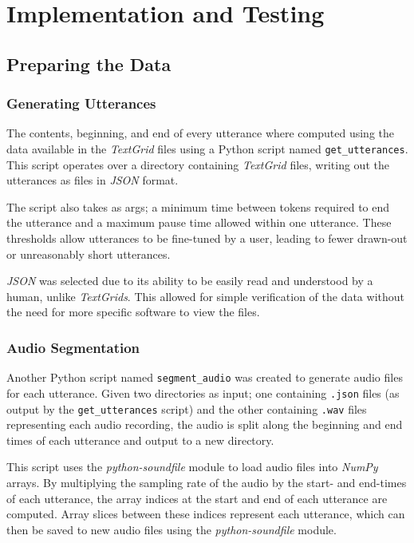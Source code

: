 \chapter{Implementation and Testing}\label{ch:implementation-and-testing}

\section{Preparing the Data}

\subsection{Generating Utterances}

The contents, beginning, and end of every utterance where computed using the data available in the \emph{TextGrid} files using a Python script named \texttt{get\_utterances}.
This script operates over a directory containing \emph{TextGrid} files, writing out the utterances as files in \emph{JSON} format.

The script also takes as args; a minimum time between tokens required to end the utterance and a maximum pause time allowed within one utterance.
These thresholds allow utterances to be fine-tuned by a user, leading to fewer drawn-out or unreasonably short utterances.

\emph{JSON} was selected due to its ability to be easily read and understood by a human, unlike \emph{TextGrids}.
This allowed for simple verification of the data without the need for more specific software to view the files.

\subsection{Audio Segmentation}

Another Python script named \texttt{segment\_audio} was created to generate audio files for each utterance. 
Given two directories as input; one containing \texttt{.json} files (as output by the \texttt{get\_utterances} script) and the other containing \texttt{.wav} files representing each audio recording, the audio is split along the beginning and end times of each utterance and output to a new directory.

This script uses the \emph{python-soundfile} module\cite{pysoundfile} to load audio files into \emph{NumPy}\cite{numpy} arrays.
By multiplying the sampling rate of the audio by the start- and end-times of each utterance, the array indices at the start and end of each utterance are computed.
Array slices between these indices represent each utterance, which can then be saved to new audio files using the \emph{python-soundfile} module.

